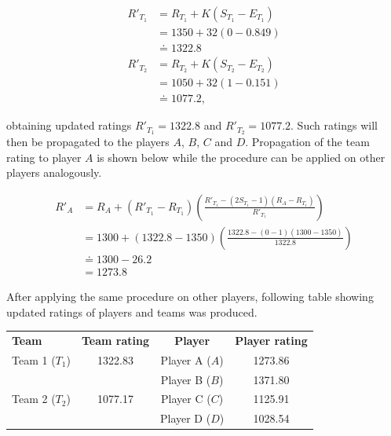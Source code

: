 \begin{example}
\begin{align*}
R'_{T_1} &= R_{T_1} + K(S_{T_1} - E_{T_1}) \\
&= 1350 + 32(0 - 0.849) \\
&\doteq 1322.8 \\[1.5em]
R'_{T_2} &= R_{T_2} + K(S_{T_2} - E_{T_2}) \\
&= 1050 + 32(1 - 0.151) \\
&\doteq 1077.2,
\end{align*}

\noindent obtaining updated ratings $R'_{T_1} = 1322.8$ and $R'_{T_2} = 1077.2$.
Such ratings will then be propagated to the players $A$, $B$, $C$ and $D$. Propagation of the team rating to player $A$ is shown below while the procedure can be applied on other players analogously.

\begin{align*}
R'_A &= R_A + (R'_{T_1} - R_{T_1})\left(\frac{R'_{T_1} - (2S_{T_1} - 1)(R_A - R_{T_1})}{R'_{T_1}}\right) \\
&= 1300 + (1322.8 - 1350)\left(\frac{1322.8 - (0 - 1)(1300 - 1350)}{1322.8}\right) \\
&\doteq 1300 - 26.2 \\
& = 1273.8
\end{align*}

After applying the same procedure on other players, following table showing updated ratings of players and teams was produced.

\begin{table}[H]
\centering
\begin{tabular}{l c c c}
\textbf{Team} & \textbf{Team rating} & \textbf{Player} & \textbf{Player rating} \\
Team 1 ($T_1$) & 1322.83 & Player A ($A$) & 1273.86 \\
& & Player B ($B$) & 1371.80 \\
Team 2 ($T_2$) & 1077.17 & Player C ($C$) & 1125.91 \\
& & Player D ($D$) & 1028.54
\end{tabular}
\end{table}
\end{example}